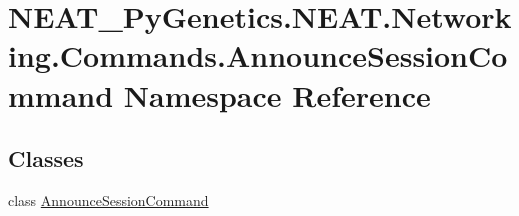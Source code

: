 \hypertarget{namespaceNEAT__PyGenetics_1_1NEAT_1_1Networking_1_1Commands_1_1AnnounceSessionCommand}{}\section{N\+E\+A\+T\+\_\+\+Py\+Genetics.\+N\+E\+A\+T.\+Networking.\+Commands.\+Announce\+Session\+Command Namespace Reference}
\label{namespaceNEAT__PyGenetics_1_1NEAT_1_1Networking_1_1Commands_1_1AnnounceSessionCommand}
\subsection*{Classes}
\begin{DoxyCompactItemize}
\item 
class \hyperlink{classNEAT__PyGenetics_1_1NEAT_1_1Networking_1_1Commands_1_1AnnounceSessionCommand_1_1AnnounceSessionCommand}{Announce\+Session\+Command}
\end{DoxyCompactItemize}
